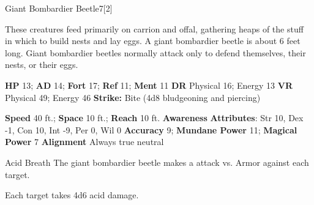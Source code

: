   \begin{monsection}{Giant Bombardier Beetle}{7}[2]
    \vspace{-1em}\vspace{-1em}
    \vspace{0em}

    
      These creatures feed primarily on carrion and offal, gathering heaps of the stuff in which to build nests and lay eggs.
      A giant bombardier beetle is about 6 feet long. Giant bombardier beetles normally attack only to defend themselves, their nests, or their eggs.
    
    

    \begin{spellcontent}
      \begin{spelltargetinginfo}
        \pari \textbf{HP} 13;
          \textbf{AD} 14;
          \textbf{Fort} 17;
          \textbf{Ref} 11;
          \textbf{Ment} 11
        \pari \textbf{DR} Physical 16; Energy 13
        \pari \textbf{VR} Physical 49; Energy 46
        \pari \textbf{Strike:}
            Bite  (4d8 bludgeoning and piercing)
      \end{spelltargetinginfo}
    \end{spellcontent}
    \begin{monsterfooter}
      \pari \textbf{Speed} 40 ft.;
        \textbf{Space} 10 ft.;
        \textbf{Reach} 10 ft.
      \pari \textbf{Awareness} 
      \pari \textbf{Attributes}:
        Str 10, Dex -1,
        Con 10, Int -9,
        Per 0, Wil 0
      \pari \textbf{Accuracy} 9;
        \textbf{Mundane Power} 11;
      \textbf{Magical Power} 7
      \pari \textbf{Alignment} Always true neutral
    \end{monsterfooter}
  \end{monsection}
  \begin{freeability}{Acid Breath}
       The giant bombardier beetle makes a  attack
        vs. Armor against each target.
    
    \hit Each target takes 4d6 acid damage.
    \end{freeability}
  
